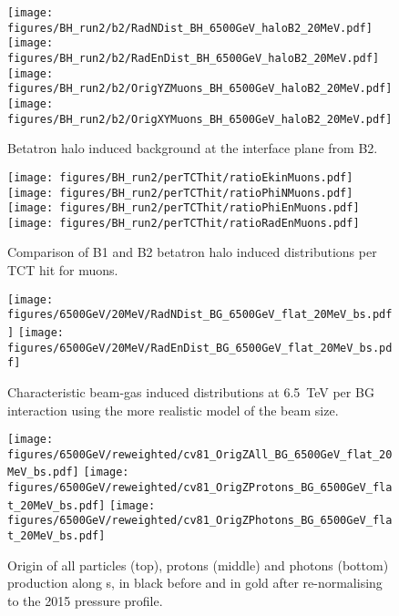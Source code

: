 \begin{figure}%
\centering
\texttt{[image: figures/BH\_run2/b2/RadNDist\_BH\_6500GeV\_haloB2\_20MeV.pdf]}
\texttt{[image: figures/BH\_run2/b2/RadEnDist\_BH\_6500GeV\_haloB2\_20MeV.pdf]}
\texttt{[image: figures/BH\_run2/b2/OrigYZMuons\_BH\_6500GeV\_haloB2\_20MeV.pdf]}
\texttt{[image: figures/BH\_run2/b2/OrigXYMuons\_BH\_6500GeV\_haloB2\_20MeV.pdf]}
 \caption{Betatron halo induced background at the interface plane from B2. 
  \label{dist6500GeVB22}}
\end{figure}

\begin{figure}%
\begin{center}
  \texttt{[image: figures/BH\_run2/perTCThit/ratioEkinMuons.pdf]}
  \texttt{[image: figures/BH\_run2/perTCThit/ratioPhiNMuons.pdf]}
  \texttt{[image: figures/BH\_run2/perTCThit/ratioPhiEnMuons.pdf]}
  \texttt{[image: figures/BH\_run2/perTCThit/ratioRadEnMuons.pdf]}
\end{center}
\vspace{-0.6cm}
 \caption{Comparison of B1 and B2 betatron halo induced distributions per TCT hit for muons.
  \label{compBHB1B2run2}}
\end{figure}

\clearpage

\begin{figure}%
\begin{center}
  \texttt{[image: figures/6500GeV/20MeV/RadNDist\_BG\_6500GeV\_flat\_20MeV\_bs.pdf]}
  \texttt{[image: figures/6500GeV/20MeV/RadEnDist\_BG\_6500GeV\_flat\_20MeV\_bs.pdf]}
\end{center}
\vspace{-0.6cm}
 \caption{Characteristic beam-gas induced distributions at 6.5~TeV per BG interaction using the more realistic model of the beam size.
  \label{bg65002}}
\end{figure}

\begin{figure}
\begin{center}
  \texttt{[image: figures/6500GeV/reweighted/cv81\_OrigZAll\_BG\_6500GeV\_flat\_20MeV\_bs.pdf]}
  \texttt{[image: figures/6500GeV/reweighted/cv81\_OrigZProtons\_BG\_6500GeV\_flat\_20MeV\_bs.pdf]}
  \texttt{[image: figures/6500GeV/reweighted/cv81\_OrigZPhotons\_BG\_6500GeV\_flat\_20MeV\_bs.pdf]}
\end{center}
\vspace{-0.6cm}
 \caption{Origin of all particles (top), protons (middle) and photons (bottom) production along s, in black before and in gold after re-normalising to the 2015 pressure profile. 
  \label{fig:OrigZ6p52}}
\end{figure}


